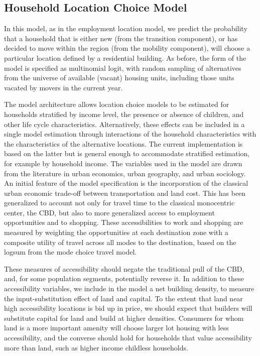 \subsection{Household Location Choice Model}
%
\label{sec:model-system-household-location-choice-model}
%
In this model, as in the employment location model, we predict the
probability that a household that is either new (from the
transition component), or has decided to move within the region
(from the mobility component), will choose a particular location
defined by a residential building.  As before, the form of the model is
specified as multinomial logit, with random sampling of
alternatives from the universe of available (vacant) housing
units, including those units vacated by movers in the current
year.

The model architecture allows location choice models to be
estimated for households stratified by income level, the presence
or absence of children, and other life cycle characteristics.
Alternatively, these effects can be included in a single model
estimation through interactions of the household characteristics
with the characteristics of the alternative locations.  The
current implementation is based on the latter but is general
enough to accommodate stratified estimation, for example by
household income. The variables used in the model are drawn from
the literature in urban economics, urban geography, and urban
sociology.  An initial feature of the model specification is the
incorporation of the classical urban economic trade-off between
transportation and land cost. This has been generalized to account
not only for travel time to the classical monocentric center, the
CBD, but also to more generalized access to employment
opportunities and to shopping. These accessibilities to work and
shopping are measured by weighting the opportunities at each
destination zone with a composite utility of travel across all
modes to the destination, based on the logsum from the mode choice
travel model.

These measures of accessibility should negate the traditional pull
of the CBD, and, for some population segments, potentially reverse
it.  In addition to these accessibility variables, we include in
the model a net building density, to measure the
input-substitution effect of land and capital.  To the extent that
land near high accessibility locations is bid up in price, we
should expect that builders will substitute capital for land and
build at higher densities.  Consumers for whom land is a more
important amenity will choose larger lot housing with less
accessibility, and the converse should hold for households that
value accessibility more than land, such as higher income
childless households.

